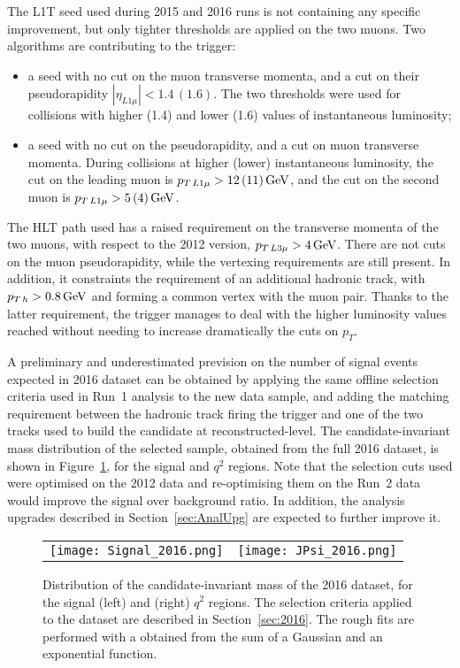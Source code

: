 The L1T seed used during 2015 and 2016 runs is not containing any specific improvement, but only tighter thresholds are applied on the two muons.
Two algorithms are contributing to the trigger:
\begin{itemize}
\item a seed with no cut on the muon transverse momenta, and a cut on their pseudorapidity $|\eta_{L1\mu}|<1.4\,(1.6)$. The two thresholds were used for collisions with higher (1.4) and lower (1.6) values of instantaneous luminosity;
\item a seed with no cut on the pseudorapidity, and a cut on muon transverse momenta. During collisions at higher (lower) instantaneous luminosity, the cut on the leading muon is $p_{T\,L1\mu}>12\,(11)\,\textrm{GeV}$, and the cut on the second muon is $p_{T\,L1\mu}>5\,(4)\,\textrm{GeV}$.
\end{itemize}

The HLT path used has a raised requirement on the transverse momenta of the two muons, with respect to the 2012 version, $p_{T\,L3\mu}>4\,\textrm{GeV}$.
There are not cuts on the muon pseudorapidity, while the vertexing requirements are still present.
In addition, it constraints the requirement of an additional hadronic track, with $p_{T\,h}>0.8\,\textrm{GeV}$ and forming a common vertex with the muon pair.
Thanks to the latter requirement, the trigger manages to deal with the higher luminosity values reached without needing to increase dramatically the cuts on $p_T$.

A preliminary and underestimated prevision on the number of signal events expected in 2016 dataset can be obtained by applying the same offline selection criteria used in Run~1 analysis to the new data sample, and adding the matching requirement between the hadronic track firing the trigger and one of the two tracks used to build the candidate at reconstructed-level.
The candidate-\PBz invariant mass distribution of the selected sample, obtained from the full 2016 dataset, is shown in Figure~\ref{fig:prosp-2016}, for the signal and \JPsi $q^2$ regions.
Note that the selection cuts used were optimised on the 2012 data and re-optimising them on the Run~2 data would improve the signal over background ratio.
In addition, the analysis upgrades described in Section~\ref{sec:AnalUpg} are expected to further improve it.

\begin{figure}[!hbt]
  \centering
  \begin{tabular}{cc}
    \texttt{[image: Signal\_2016.png]} &
    \texttt{[image: JPsi\_2016.png]}
  \end{tabular}
  \caption{Distribution of the candidate-\PBz invariant mass of the 2016 dataset, for the signal (left) and \JPsi (right) $q^2$ regions.
    The selection criteria applied to the dataset are described in Section~\ref{sec:2016}.
    The rough fits are performed with a \pdf obtained from the sum of a Gaussian and an exponential function.
  \label{fig:prosp-2016}}
\end{figure}


